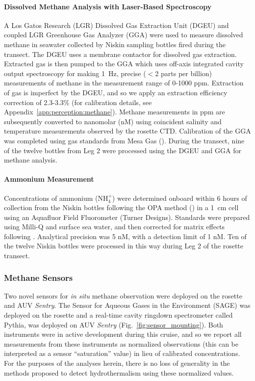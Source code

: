 \paragraph{Dissolved Methane Analysis with Laser-Based Spectroscopy}
A Los Gatos Research (LGR) Dissolved Gas Extraction Unit (DGEU) and coupled LGR Greenhouse Gas Analyzer (GGA) were used to measure dissolved methane in seawater collected by Niskin sampling bottles fired during the transect. The DGEU uses a membrane contactor for dissolved gas extraction. Extracted gas is then pumped to the GGA which uses off-axis integrated cavity output spectroscopy for making \SI{1}{\hertz}, precise ($<$2 parts per billion) measurements of methane in the measurement range of 0-1000 ppm. Extraction of gas is imperfect by the DGEU, and so we apply an extraction efficiency correction of 2.3-3.3\% (for calibration details, see Appendix~\ref{app:perception:methane}). Methane measurements in ppm are subsequently converted to nanomolar (nM) using coincident salinity and temperature measurements observed by the rosette CTD. Calibration of the GGA was completed using gas standards from Mesa Gas (\cite{michel2021observations}). During the transect, nine of the twelve bottles from Leg 2 were processed using the DGEU and GGA for methane analysis.

\paragraph{Ammonium Measurement}
Concentrations of ammonium (NH$_4^+$) were determined onboard within 6 hours of collection from the Niskin bottles following the OPA method (\cite{holmes1999simple}) in a \SI{1}{\centi\meter} cell using an Aquafluor Field Fluorometer (Turner Designs). Standards were prepared using Milli-Q and surface sea water, and then corrected for matrix effects following \cite{taylor2007improving}. Analytical precision was 5 nM, with a detection limit of 1 nM. Ten of the twelve Niskin bottles were processed in this way during Leg 2 of the rosette transect.

\subsubsection{Methane Sensors}
Two novel sensors for \emph{in situ} methane observation were deployed on the rosette and AUV \emph{Sentry}. The Sensor for Aqueous Gases in the Environment (SAGE) was deployed on the rosette and a real-time cavity ringdown spectrometer called Pythia, was deployed on AUV \emph{Sentry} (Fig.~\ref{fig:sensor_mounting}). Both instruments were in active development during this cruise, and so we report all measurements from these instruments as normalized observations (this can be interpreted as a sensor ``saturation'' value) in lieu of calibrated concentrations. For the purposes of the analyses herein, there is no loss of generality in the methods proposed to detect hydrothermalism using these normalized values.


